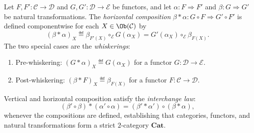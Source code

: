 \begin{definition}
Let $F, F' : \mathcal{C} \to \mathcal{D}$ and $G, G' : \mathcal{D} \to \mathcal{E}$ be functors, and let $\alpha : F \Rightarrow F'$ and $\beta : G \Rightarrow G'$ be natural transformations. The \emph{horizontal composition} $\beta * \alpha : G \circ F \Rightarrow G' \circ F'$ is defined componentwise for each $X \in \Ob(\mathcal{C})$ by
\[
(\beta * \alpha)_X \eqdef \beta_{F'(X)} \circ_{\mathcal{E}} G(\alpha_X) = G'(\alpha_X) \circ_{\mathcal{E}} \beta_{F(X)}.
\]
The two special cases are the \emph{whiskerings}:
\begin{enumerate}
    \item Pre-whiskering: $(G * \alpha)_X \eqdef G(\alpha_X)$ for a functor $G : \mathcal{D} \to \mathcal{E}$.
    \item Post-whiskering: $(\beta * F)_X \eqdef \beta_{F(X)}$ for a functor $F : \mathcal{C} \to \mathcal{D}$.
\end{enumerate}
Vertical and horizontal composition satisfy the \emph{interchange law}:
\[
(\beta' \circ \beta) * (\alpha' \circ \alpha) = (\beta' * \alpha') \circ (\beta * \alpha),
\]
whenever the compositions are defined, establishing that categories, functors, and natural transformations form a strict $2$-category $\mathbf{Cat}$.
\end{definition}
